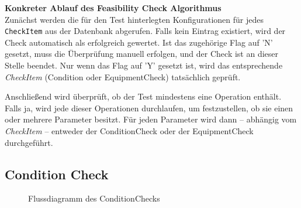 \textbf{Konkreter Ablauf des Feasibility Check Algorithmus} \\
Zunächst werden die für den Test hinterlegten Konfigurationen für jedes \texttt{CheckItem} aus der Datenbank abgerufen. Falls kein Eintrag existiert, wird der Check automatisch als erfolgreich gewertet. Ist das zugehörige Flag auf 'N' gesetzt, muss die Überprüfung manuell erfolgen, und der Check ist an dieser Stelle beendet. Nur wenn das Flag auf 'Y' gesetzt ist, wird das entsprechende \textit{CheckItem} (Condition oder \gls{EquipmentCheck}) tatsächlich geprüft.

Anschließend wird überprüft, ob der Test mindestens eine Operation enthält. Falls ja, wird jede dieser Operationen durchlaufen, um festzustellen, ob sie einen oder mehrere Parameter besitzt. Für jeden Parameter wird dann – abhängig vom \textit{CheckItem} – entweder der \gls{ConditionCheck} oder der \gls{EquipmentCheck} durchgeführt.

\subsection{Condition Check}

\begin{figure}[!htbp]
    \centering
    \caption{Flussdiagramm des \gls{ConditionCheck}s}
    \label{fig:condition-check}
\end{figure}

